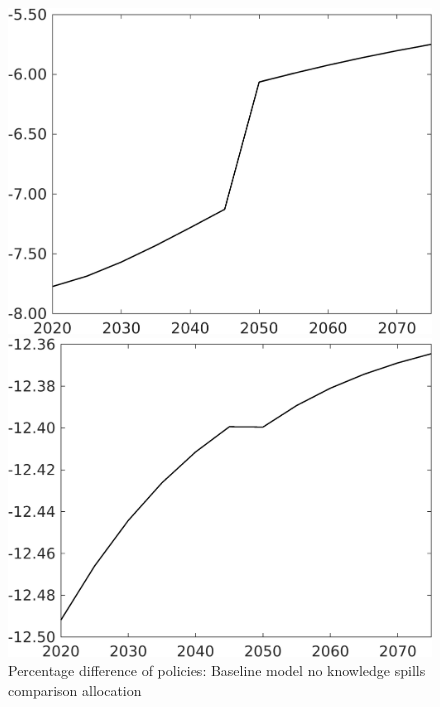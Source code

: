 \documentclass[12pt]{article}
\begin{document}
\begin{figure}[h!!]
	\centering
	\caption{Percentage difference of policies: Baseline model no knowledge spills comparison allocation}\label{fig:Pertauf_nsk0_xgr0_noknow}
	\begin{minipage}[]{0.32\textwidth}
		\includegraphics[width=1\textwidth]{../../codding_model/own_basedOnFried/optimalPol_010922_revision/figures/all_13Sept22/CompTaufPER_bytaul_Equlab_Reg0_tauf_spillover0_nsk0_xgr0_knspil1_sep1_LFlimit1_emsbase0_countec0_GovRev0_etaa0.79_lgd0.png}
	\end{minipage}		
	\begin{minipage}[]{0.32\textwidth}
		\includegraphics[width=1\textwidth]{../../codding_model/own_basedOnFried/optimalPol_010922_revision/figures/all_13Sept22/CompTaufPER_bytaul_Equlab_Reg0_hh_spillover0_nsk0_xgr0_knspil1_sep1_LFlimit1_emsbase0_countec0_GovRev0_etaa0.79_lgd0.png}

\end{minipage}
\end{figure}
\end{document}
